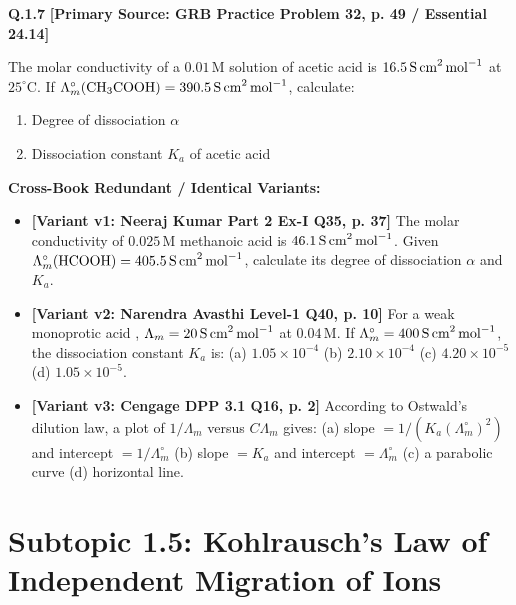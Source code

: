 \begin{problembox}
\textbf{Q.1.7} \hfill \textbf{[Primary Source: GRB Practice Problem 32, p. 49 / Essential  24.14]}
\label{q:qb-c1-07}

The molar conductivity of a $0.01\,\text{M}$ solution of acetic acid is $16.5\,\text{S\,cm}^2\,\text{mol}^{-1}$ at $25^\circ\text{C}$. If $\Lambda_m^\circ(\ce{CH3COOH}) = 390.5\,\text{S\,cm}^2\,\text{mol}^{-1}$, calculate:
\begin{enumerate}[label=(\alph*)]
    \item Degree of dissociation $\alpha$
    \item Dissociation constant $K_a$ of acetic acid
\end{enumerate}

\tcbline
\textbf{\color{accentamber}Cross-Book Redundant / Identical Variants:}
\begin{itemize}[leftmargin=*,itemsep=2pt]
    \item \textbf{[Variant v1: Neeraj Kumar Part 2 Ex-I Q35, p. 37]} The molar conductivity of $0.025\,\text{M}$ methanoic acid is $46.1\,\text{S\,cm}^2\,\text{mol}^{-1}$. Given $\Lambda_m^\circ(\ce{HCOOH}) = 405.5\,\text{S\,cm}^2\,\text{mol}^{-1}$, calculate its degree of dissociation $\alpha$ and $K_a$.
    \item \textbf{[Variant v2: Narendra Avasthi Level-1 Q40, p. 10]} For a weak monoprotic acid , $\Lambda_m = 20\,\text{S\,cm}^2\,\text{mol}^{-1}$ at $0.04\,\text{M}$. If $\Lambda_m^\circ = 400\,\text{S\,cm}^2\,\text{mol}^{-1}$, the dissociation constant $K_a$ is: (a) $1.05 \times 10^{-4}$ (b) $2.10 \times 10^{-4}$ (c) $4.20 \times 10^{-5}$ (d) $1.05 \times 10^{-5}$.
    \item \textbf{[Variant v3: Cengage DPP 3.1 Q16, p. 2]} According to Ostwald's dilution law, a plot of $1/\Lambda_m$ versus $C \Lambda_m$ gives: (a) slope $= 1/(K_a (\Lambda_m^\circ)^2)$ and intercept $= 1/\Lambda_m^\circ$ (b) slope $= K_a$ and intercept $= \Lambda_m^\circ$ (c) a parabolic curve (d) horizontal line.
\end{itemize}
\end{problembox}

\section{Subtopic 1.5: Kohlrausch's Law of Independent Migration of Ions}

